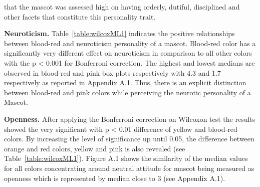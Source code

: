 that the mascot was assessed high on having orderly, dutiful, disciplined and other facets that constitute this personality trait.
\par \textbf{Neuroticism.} Table~\ref{table:wilcoxML1} indicates the positive relationships between blood-red and
neuroticism personality of a mascot. Blood-red color has a significantly very different effect on neuroticism in
comparison to all other colors with the p < 0.001 for Bonferroni correction. The highest and lowest medians are observed
in blood-red and pink box-plots respectively with 4.3 and 1.7 respectively as reported in Appendix A.1. Thus, there is
an explicit distinction between blood-red and pink colors while perceiving the neurotic personality of a Mascot.
\par \textbf{Openness.} After applying the  Bonferroni correction on Wilcoxon test the results showed the very
significant with p < 0.01 difference of yellow and blood-red colors. By increasing the level of significance up until 0.05,
the difference between orange and red colors, yellow and pink is also revealed (see Table~\ref{table:wilcoxML1}).
Figure A.1 shows the similarity of the median values for all colors concentrating around neutral attitude for mascot
being measured as openness which is represented by median close to 3 (see Appendix A.1).

